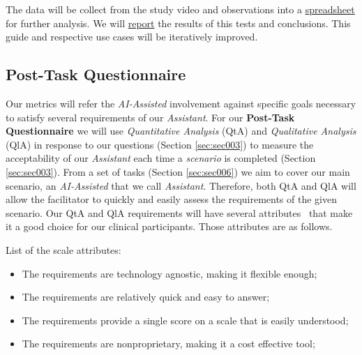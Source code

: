 The data will be collect from the study video and observations into a \hyperlink{https://docs.google.com/spreadsheets/d/1CoPLONnINdBWryGs7SBRuPZA-DnQ0t_yzx3u8ym0UoI/edit?usp=sharing}{spreadsheet} for further analysis. We will \hyperlink{https://github.com/mida-project/research-reports}{report} the results of this tests and conclusions. This guide and respective use cases will be iteratively improved.










\subsection{Post-Task Questionnaire}

Our metrics will refer the \textit{AI-Assisted} involvement against specific goals necessary to satisfy several requirements of our \textit{Assistant}. For our \textbf{Post-Task Questionnaire} we will use \textit{Quantitative Analysis} (QtA) and \textit{Qualitative Analysis} (QlA) in response to our questions (Section \ref{sec:sec003}) to measure the acceptability of our \textit{Assistant} each time a \textit{scenario} is completed (Section \ref{sec:sec003}). From a set of tasks (Section \ref{sec:sec006}) we aim to cover our main scenario, an \textit{AI-Assisted} that we call \textit{Assistant}. Therefore, both QtA and QlA will allow the facilitator to quickly and easily assess the requirements of the given scenario. Our QtA and QlA requirements will have several attributes~\cite{joyce2017healthcare} that make it a good choice for our clinical participants. Those attributes are as follows.

\hfill


List of the scale attributes:


\hfill

\begin{itemize}
  \item The requirements are technology agnostic, making it flexible enough;
  \item The requirements are relatively quick and easy to answer;
  \item The requirements provide a single score on a scale that is easily understood;
  \item The requirements are nonproprietary, making it a cost effective tool;
\end{itemize}

